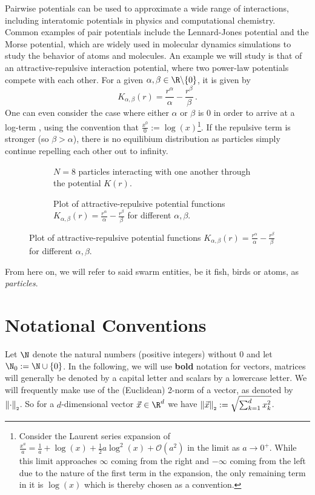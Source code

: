 Pairwise potentials can be used to approximate a wide range of interactions, including interatomic potentials in physics and computational chemistry.
Common examples of pair potentials include the Lennard-Jones potential and the Morse potential, which are widely used in molecular dynamics simulations to study the behavior of atoms and molecules.
An example we will study is that of an attractive-repulsive interaction potential, where two power-law potentials compete with each other.
For a given $\alpha, \beta \in \R \backslash \{0\}$, it is given by
$$K_{\alpha, \beta}(r) = \frac{r^\alpha}{\alpha} - \frac{r^\beta}{\beta}\,.$$
One can even consider the case where either $\alpha$ or $\beta$ is 0 in order to arrive at a log-term \parencite{2017-explicit-solutions}, using the convention that $\frac{x^0}{0} := \log(x)$\footnote{
  Consider the Laurent series expansion of $\frac{x^a}{a} = \frac{1}{a} + \log(x) + \frac{1}{2}a \log^2(x) + \mathcal{O}(a^2)$ in the limit as $a \rightarrow 0^+$.
  While this limit approaches $\infty$ coming from the right and $-\infty$ coming from the left due to the nature of the first term in the expansion, the only remaining term in it is $\log(x)$ which is thereby chosen as a convention.
}.
If the repulsive term is stronger (so $\beta > \alpha$), there is no equilibium distribution as particles simply continue repelling each other out to infinity.

\begin{figure}[H]
  \centering
  \begin{subfigure}[t]{0.5\textwidth}
    \centering
    \caption{$N = 8$ particles interacting with one another through the potential $K(r)$.}
    \label{fig:problem-setting}
  \end{subfigure}
  \hfill
  \begin{subfigure}[t]{0.49\textwidth}
    \centering
    \caption{Plot of attractive-repulsive potential functions $K_{\alpha, \beta}(r) = \frac{r^\alpha}{\alpha} - \frac{r^\beta}{\beta}$ for different $\alpha, \beta$.}
    \label{fig:potential-function}
  \end{subfigure}
\end{figure}

From here on, we will refer to said swarm entities, be it fish, birds or atoms, as \textit{particles}.

\section{Notational Conventions}
Let $\N$ denote the natural numbers (positive integers) without $0$ and let $\N_0 := \N \cup \{0\}$.
In the following, we will use \textbf{bold} notation for vectors, matrices will generally be denoted by a capital letter and scalars by a lowercase letter.
We will frequently make use of the (Euclidean) 2-norm of a vector, as denoted by $\left\lVert\cdot\right\rVert_{\scriptscriptstyle 2}$.
So for a $d$-dimensional vector $\vec{x} \in \R^d$ we have $\left\lVert\vec{x}\right\rVert_{\scriptscriptstyle 2} := \sqrt{\sum_{k=1}^d x_k^2}$.

